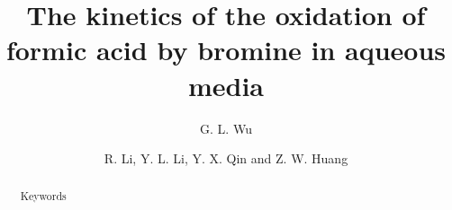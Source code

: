 \documentclass[%
 reprint,
 amsmath,amssymb,
 aps,
10.5pt,
]{revtex4-1}
\begin{document}

\title{The kinetics of the oxidation of formic acid by bromine in aqueous media}%

\author{G. L. Wu}


\author{R. Li, Y. L. Li, Y. X. Qin and Z. W. Huang}
%





\begin{abstract}

\begin{description}
\item[Keywords]

\end{description}
\end{abstract}

\maketitle

\tableofcontents
\end{document}
